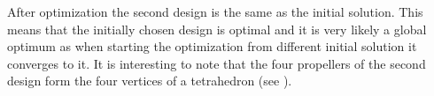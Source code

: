 After optimization the second design is the same as the initial solution. This means
that the initially chosen design is optimal and it is very likely a global optimum
as when starting the optimization from different initial solution it converges to it.
It is interesting to note that the four propellers of the second design form the four
vertices of a tetrahedron (see ).
\begin{figure}[!h]
\end{figure}
